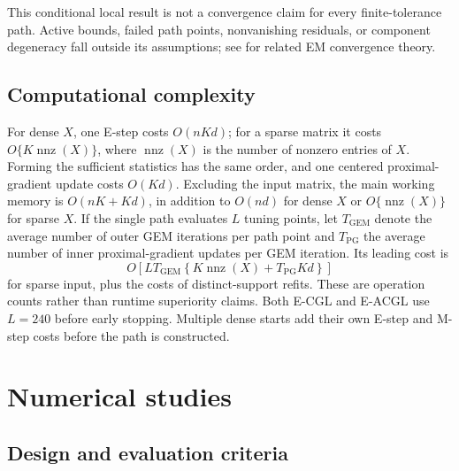 \documentclass[preprint,12pt,authoryear]{elsarticle}
\begin{document}
This conditional local result is not a convergence claim for every
finite-tolerance path. Active bounds, failed path points, nonvanishing
residuals, or component degeneracy fall outside its assumptions; see
\citep{dempster1977em,green1990penalizedem,wu1983em,tseng2004emproximal}
for related EM convergence theory.

\subsection{Computational complexity}

For dense $X$, one E-step costs $O(nKd)$; for a sparse matrix it costs
$O\{K\operatorname{nnz}(X)\}$, where $\operatorname{nnz}(X)$ is the number of
nonzero entries of $X$. Forming the sufficient statistics has the same
order, and one centered proximal-gradient update costs $O(Kd)$. Excluding the
input matrix, the main working memory is $O(nK+Kd)$, in addition to
$O(nd)$ for dense $X$ or $O\{\operatorname{nnz}(X)\}$ for sparse $X$. If the
single path evaluates $L$ tuning points, let $T_{\mathrm{GEM}}$ denote the
average number of outer GEM iterations per path point and
$T_{\mathrm{PG}}$ the average number of inner proximal-gradient updates per
GEM iteration. Its leading cost is
\[
O\left[LT_{\mathrm{GEM}}
\left\{K\operatorname{nnz}(X)+T_{\mathrm{PG}}Kd\right\}\right]
\]
for sparse input, plus the costs of distinct-support refits. These are
operation counts rather than runtime superiority claims.
Both E-CGL and E-ACGL use $L=240$ before early stopping. Multiple dense
starts add their own E-step and M-step costs before the path is constructed.

\section{Numerical studies}
\label{sec:simulations}

\subsection{Design and evaluation criteria}
\end{document}
